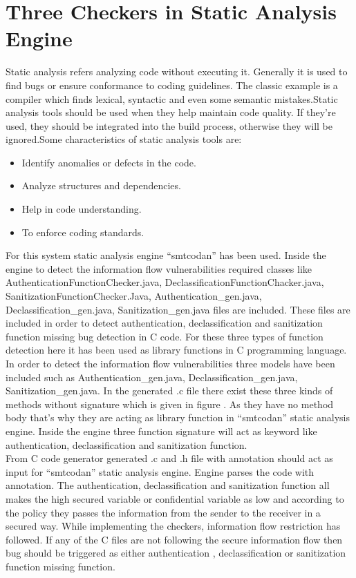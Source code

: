 \section{Three Checkers in Static Analysis Engine}
Static analysis refers analyzing code without executing it. Generally it is used to find bugs or ensure conformance to coding guidelines. The classic example is a compiler which finds lexical, syntactic and even some semantic mistakes.Static analysis tools should be used when they help maintain code quality. If they're used, they should be integrated into the build process, otherwise they will be ignored.Some characteristics of static analysis tools are:
\begin{itemize}	
	\item Identify anomalies or defects in the code.
	\item Analyze structures and dependencies.
	\item Help in code understanding.
	\item To enforce coding standards.
\end{itemize}

For this system static analysis engine \enquote{smtcodan}  has been used. Inside the engine to detect the information flow vulnerabilities required classes like AuthenticationFunctionChecker.java, DeclassificationFunctionChacker.java, SanitizationFunctionChecker.Java, Authentication\_gen.java,\\
Declassification\_gen.java,
Sanitization\_gen.java files are included. These files are included in order to detect authentication, declassification and sanitization function missing bug detection in C code. For these three types of function detection here it has been used as library functions in C programming language. In order to detect the information flow vulnerabilities three models have been included such as Authentication\_gen.java,
Declassification\_gen.java,
Sanitization\_gen.java. In the generated .c file there exist these three kinds of methods without signature which is given in figure . As they have no method body that's why they are acting as library function in \enquote{smtcodan} static analysis engine. Inside the engine three function signature will act as keyword like authentication, declassification and sanitization function. \\

From C code generator generated .c and .h file with annotation should act as input for \enquote{smtcodan} static analysis engine. Engine parses the code with annotation. The authentication, declassification and sanitization function all makes the high secured variable or confidential variable as low and according to the policy they passes the information from the sender to the receiver in a secured way. While implementing the checkers, information flow restriction has followed. If any of the C files are not following the secure information flow then bug should be triggered as either authentication , declassification or sanitization function missing function.

